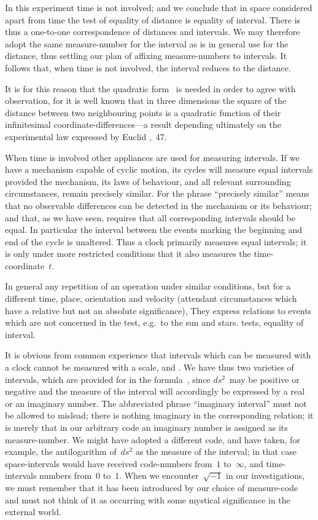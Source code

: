 \documentclass[12pt]{book}
\begin{document}
In this experiment time is not involved; and we conclude that in space
considered apart from time the test of equality of distance is equality of
interval. There is thus a one-to-one correspondence of distances and intervals.
We may therefore adopt the same measure-number for the interval as is in
general use for the distance, thus settling our plan of affixing measure-numbers
to intervals. It follows that, when time is not involved, the interval
reduces to the distance.

It is for this reason that the quadratic form~ is needed in order to
agree with observation, for it is well known that in three dimensions the
square of the distance between two neighbouring points is a quadratic
function of their infinitesimal coordinate-differences---a result depending
ultimately on the experimental law expressed by Euclid ,~47.

When time is involved other appliances are used for measuring intervals.
If we have a mechanism capable of cyclic motion, its cycles will measure
equal intervals provided the mechanism, its laws of behaviour, and all relevant
surrounding circumstances, remain precisely similar. For the phrase ``precisely
similar'' means that no observable differences can be detected in the mechanism
or its behaviour; and that, as we have seen, requires that all corresponding
intervals should be equal. In particular the interval between the events
marking the beginning and end of the cycle is unaltered. Thus a clock
primarily measures equal intervals; it is only under more restricted conditions
that it also measures the time-coordinate~$t$.

In general any repetition of an operation under similar conditions, but for
a different time, place, orientation and velocity (attendant circumstances
which have a relative but not an absolute significance\footnotemark),\footnotetext
  {They express relations to events which are not concerned in the test, e.g.\ to the sun and
  stars.}
tests, equality of
interval.

It is obvious from common experience that intervals which can be
measured with a clock cannot be measured with a scale, and . We
have thus two varieties of intervals, which are provided for in the formula~,
since $ds^{2}$~may be positive or negative and the measure of the interval
will accordingly be expressed by a real or an imaginary number. The
%
abbreviated phrase ``imaginary interval'' must not be allowed to mislead;
there is nothing imaginary in the corresponding relation; it is merely that in
our arbitrary code an imaginary number is assigned as its measure-number.
We might have adopted a different code, and have taken, for example, the
antilogarithm of~$ds^{2}$ as the measure of the interval; in that case space-intervals
would have received code-numbers from~$1$ to~$\infty$, and time-intervals
numbers from~$0$ to~$1$. When we encounter~$\sqrt{-1}$ in our investigations, we
must remember that it has been introduced by our choice of measure-code
and must not think of it as occurring with some mystical significance in the
external world.
\end{document}
